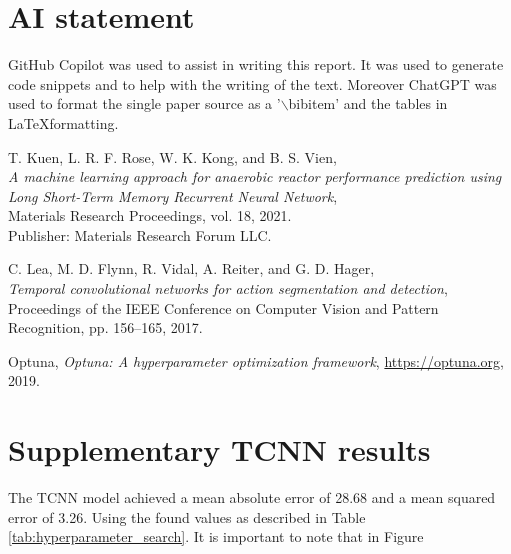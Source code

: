 \documentclass[conference]{IEEEtran}
\begin{document}
\section*{AI statement}
GitHub Copilot was used to assist in writing this report. It was used to generate code snippets and
to help with the writing of the text. Moreover ChatGPT was used to format the single paper source 
as a '$\backslash$bibitem' and the tables in \LaTeX formatting.


\begin{thebibliography}{9}

    T. Kuen, L. R. F. Rose, W. K. Kong, and B. S. Vien,\\
    \textit{A machine learning approach for anaerobic reactor performance prediction using Long 
    Short-Term Memory Recurrent Neural Network},\\
    Materials Research Proceedings, vol. 18, 2021.\\
    Publisher: Materials Research Forum LLC.

    C. Lea, M. D. Flynn, R. Vidal, A. Reiter, and G. D. Hager,\\
    \textit{Temporal convolutional networks for action segmentation and detection},\\
    Proceedings of the IEEE Conference on Computer Vision and Pattern Recognition, pp. 156--165, 2017.

    Optuna, \textit{Optuna: A hyperparameter optimization framework}, \url{https://optuna.org}, 2019.
    
\end{thebibliography}

\clearpage
\onecolumn
\section*{Supplementary TCNN results}\label{suppltcnnresults}
The TCNN model achieved a mean absolute error of 28.68 and a mean squared error of 3.26. Using the
found values as described in Table \ref{tab:hyperparameter_search}. It is important to note that in
Figure 
\end{document}
